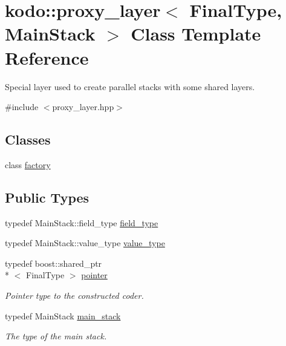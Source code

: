 \hypertarget{classkodo_1_1proxy__layer}{\section{kodo\-:\-:proxy\-\_\-layer$<$ Final\-Type, Main\-Stack $>$ Class Template Reference}
\label{classkodo_1_1proxy__layer}
}


Special layer used to create parallel stacks with some shared layers.  




{\ttfamily \#include $<$proxy\-\_\-layer.\-hpp$>$}

\subsection*{Classes}
\begin{DoxyCompactItemize}
\item 
class \hyperlink{classkodo_1_1proxy__layer_1_1factory}{factory}
\end{DoxyCompactItemize}
\subsection*{Public Types}
\begin{DoxyCompactItemize}
\item 
typedef Main\-Stack\-::field\-\_\-type \hyperlink{classkodo_1_1proxy__layer_a236cbb490120ba8f7ae79482319df6cc}{field\-\_\-type}
\begin{DoxyCompactList}\small\item\em \end{DoxyCompactList}\item 
typedef Main\-Stack\-::value\-\_\-type \hyperlink{classkodo_1_1proxy__layer_a1e9ff5aada4a2ab5dc0ce4e7df39160a}{value\-\_\-type}
\begin{DoxyCompactList}\small\item\em \end{DoxyCompactList}\item 
\hypertarget{classkodo_1_1proxy__layer_a71fd0add2f17f6506c5457348922e966}{typedef boost\-::shared\-\_\-ptr\\*
$<$ Final\-Type $>$ \hyperlink{classkodo_1_1proxy__layer_a71fd0add2f17f6506c5457348922e966}{pointer}}\label{classkodo_1_1proxy__layer_a71fd0add2f17f6506c5457348922e966}

\begin{DoxyCompactList}\small\item\em Pointer type to the constructed coder. \end{DoxyCompactList}\item 
\hypertarget{classkodo_1_1proxy__layer_a7e2f9b1724f89d5ccfd341d7c2fb7baf}{typedef Main\-Stack \hyperlink{classkodo_1_1proxy__layer_a7e2f9b1724f89d5ccfd341d7c2fb7baf}{main\-\_\-stack}}\label{classkodo_1_1proxy__layer_a7e2f9b1724f89d5ccfd341d7c2fb7baf}

\begin{DoxyCompactList}\small\item\em The type of the main stack. \end{DoxyCompactList}\end{DoxyCompactItemize}

